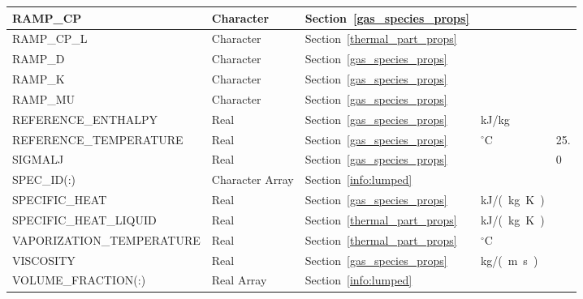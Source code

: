 \documentclass[11pt]{book}
\begin{document}
\begin{longtable}{@{\extracolsep{\fill}}|l|l|l|l|l|}
{\ct RAMP\_CP}                      & Character   & Section~\ref{gas_species_props}         &                   &               \\ \hline
{\ct RAMP\_CP\_L}                   & Character   & Section~\ref{thermal_part_props}        &                   &               \\ \hline
{\ct RAMP\_D}                       & Character   & Section~\ref{gas_species_props}         &                   &               \\ \hline
{\ct RAMP\_K}                       & Character   & Section~\ref{gas_species_props}         &                   &               \\ \hline
{\ct RAMP\_MU}                      & Character   & Section~\ref{gas_species_props}         &                   &               \\ \hline
{\ct REFERENCE\_ENTHALPY}           & Real        & Section~\ref{gas_species_props}         & kJ/kg             &               \\ \hline
{\ct REFERENCE\_TEMPERATURE}        & Real        & Section~\ref{gas_species_props}         & $^\circ$C         & 25.           \\ \hline
{\ct SIGMALJ}                       & Real        & Section~\ref{gas_species_props}         &                   & 0             \\ \hline
{\ct SPEC\_ID(:)}                   & Character Array   & Section~\ref{info:lumped}             &                   &               \\ \hline
{\ct SPECIFIC\_HEAT}                & Real        & Section~\ref{gas_species_props}         & \si{kJ/(kg.K)}    &               \\ \hline
{\ct SPECIFIC\_HEAT\_LIQUID}        & Real        & Section~\ref{thermal_part_props}        & \si{kJ/(kg.K)}    &               \\ \hline
{\ct VAPORIZATION\_TEMPERATURE}     & Real        & Section~\ref{thermal_part_props}        & $^\circ$C         &               \\ \hline
{\ct VISCOSITY}                     & Real        & Section~\ref{gas_species_props}         & \si{kg/(m.s)}     &               \\ \hline
{\ct VOLUME\_FRACTION(:)}           & Real Array        & Section~\ref{info:lumped}             &                   &               \\ \hline
\end{longtable}

\vspace{\baselineskip}
\end{document}
